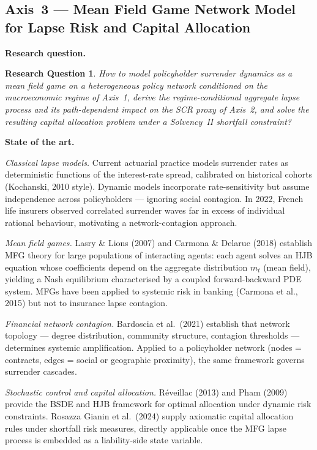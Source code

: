 \documentclass[11pt,a4paper]{article}
\newtheorem{rqthm}{Research Question}
\begin{document}
\subsection{Axis~3 --- Mean Field Game Network Model for Lapse Risk
  and Capital Allocation}

\noindent\textbf{Research question.}
\begin{rqthm}
How to model policyholder surrender dynamics as a mean field game on a
heterogeneous policy network conditioned on the macroeconomic regime of
Axis~1, derive the regime-conditional aggregate lapse process and its
path-dependent impact on the SCR proxy of Axis~2, and solve the resulting
capital allocation problem under a Solvency~II shortfall constraint?
\end{rqthm}

\noindent\textbf{State of the art.}

\textit{Classical lapse models.}
Current actuarial practice models surrender rates as deterministic functions
of the interest-rate spread, calibrated on historical cohorts (Kochanski,
2010 style). Dynamic models incorporate rate-sensitivity but assume
independence across policyholders --- ignoring social contagion. In 2022,
French life insurers observed correlated surrender waves far in excess of
individual rational behaviour, motivating a network-contagion approach.

\textit{Mean field games.}
Lasry \& Lions (2007) and Carmona \& Delarue (2018) establish MFG theory
for large populations of interacting agents: each agent solves an HJB
equation whose coefficients depend on the aggregate distribution $m_t$
(mean field), yielding a Nash equilibrium characterised by a coupled
forward-backward PDE system. MFGs have been applied to systemic risk in
banking (Carmona et al., 2015) but not to insurance lapse contagion.

\textit{Financial network contagion.}
Bardoscia et al.\ (2021) establish that network topology --- degree
distribution, community structure, contagion thresholds --- determines
systemic amplification. Applied to a policyholder network (nodes = contracts,
edges = social or geographic proximity), the same framework governs surrender
cascades.

\textit{Stochastic control and capital allocation.}
R\'{e}veillac (2013) and Pham (2009) provide the BSDE and HJB framework
for optimal allocation under dynamic risk constraints. Rosazza Gianin et al.\
(2024) supply axiomatic capital allocation rules under shortfall risk measures,
directly applicable once the MFG lapse process is embedded as a liability-side
state variable.
\end{document}
